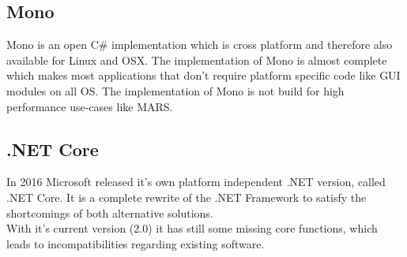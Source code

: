 \subsection{Mono}
Mono is an open C\# implementation which is cross platform and therefore also available for Linux and OSX. The implementation of Mono is almost complete which makes most applications that don't require platform specific code like GUI modules on all OS. The implementation of Mono is not build for high performance use-cases like MARS.

\subsection{.NET Core}
In 2016 Microsoft released it's own platform independent .NET version, called .NET Core. It is a complete rewrite of the .NET Framework to satisfy the shortcomings of both alternative solutions.\\
With it's current version (2.0) it has still some missing core functions, which leads to incompatibilities regarding existing software.

